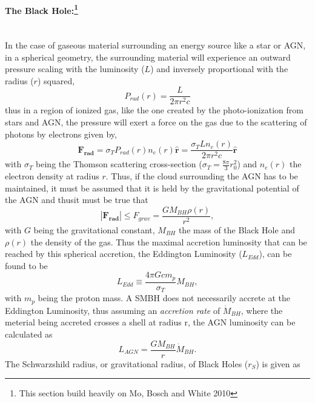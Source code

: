 \documentclass[a4paper, 12pt, twoside]{article}
\begin{document}
\paragraph[The Black Hole:]{The Black Hole:\footnote{This section build heavily on Mo, Bosch and White 2010}}\mbox{}\\
In the case of gaseous material surrounding an energy source like a star or AGN, in a spherical geometry, the surrounding material will experience an outward pressure scaling with the luminosity ($L$) and inversely proportional with the radius ($r$) squared,
\begin{equation}
P_{rad}(r) = \frac{L} {2\pi r^{2}c}
\label{eq:P_rad}
\end{equation}
thus in a region of ionized gas, like the one created by the photo-ionization from stars and AGN, the pressure will exert a force on the gas due to the scattering of photons by electrons given by,
\begin{equation}
\mathbf{F_{rad}} = \sigma_{T}P_{rad}(r)n_{e}(r) \mathbf{\hat{r}} = \frac{\sigma_{T}Ln_{e}(r)}{2\pi r^{2}c}\mathbf{\hat{r}}
\label{eq:F_rad}
\end{equation}
with $\sigma_{T}$ being the Thomson scattering cross-section ($\sigma_{T} = \frac{8\pi}{3}r_{0}^{2}$) and $n_{e}(r)$ the electron density at radius $r$. Thus, if the cloud surrounding the AGN has to be maintained, it must be assumed that it is held by the gravitational potential of the AGN and thusit must be true that
\begin{equation}
|\mathbf{F_{rad}}| \le F_{grav} = \frac{GM_{BH}\rho(r)} {r^{2}},
\label{eq:F_grav}
\end{equation}
with $G$ being the gravitational constant, $M_{BH}$ the mass of the Black Hole and $\rho(r)$ the density of the gas. Thus the maximal accretion luminosity that can be reached by this spherical accretion, the Eddington Luminosity ($L_{Edd}$), can be found to be
\begin{equation}
L_{Edd} \equiv \frac{4\pi Gcm_{p}}{\sigma_{T}}M_{BH},
\label{eq:L_Edd}
\end{equation}
with $m_{p}$ being the proton mass. A SMBH does not necessarily accrete at the Eddington Luminosity, thus assuming an \emph{accretion rate} of $\dot{M}_{BH}$, where the meterial being accreted crosses a shell at radius r, the AGN luminosity can be calculated as
\begin{equation}
L_{AGN} = \frac{GM_{BH}} {r}\dot{M}_{BH}.
\label{eq:L_AGN}
\end{equation}
The Schwarzshild radius, or gravitational radius, of Black Holes ($r_S$) is given as
\end{document}
